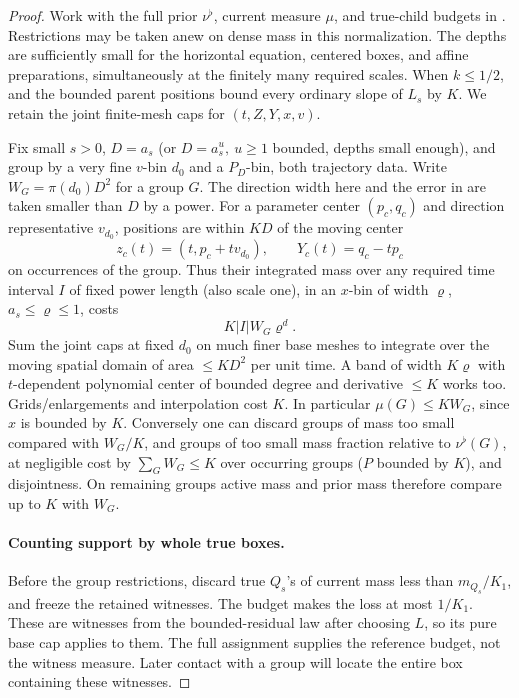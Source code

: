 \begin{proof}
Work with the full prior \(\nu^\flat\), current measure
\(\mu\), and true-child budgets in .
Restrictions may be taken anew on dense mass in this normalization.
The depths are sufficiently small for the horizontal equation,
centered boxes, and affine preparations, simultaneously at the
finitely many required scales.  When \(k\le1/2\),
 and the bounded parent positions
bound every ordinary slope of \(L_s\) by \(K\).  We retain
the joint finite-mesh caps for \((t,Z,Y,x,v)\).

Fix small \(s>0\), \(D=a_s\) (or \(D=a_s^u,\ u\ge1\) bounded, depths small enough), and group by a very fine \(v\)-bin \(d_0\) and a \(P_D\)-bin, both trajectory data. Write \(W_G=\pi(d_0)D^2\) for a group \(G\). The direction width here and the error in  are taken smaller than \(D\) by a power. For a parameter center \((p_c,q_c)\) and direction representative \(v_{d_0}\), positions are within \(K D\) of the moving center
\[
 z_c(t)=(t,p_c+t v_{d_0}),\qquad Y_c(t)=q_c-tp_c
\]
on occurrences of the group. Thus their integrated mass over any required time interval \(I\) of fixed power length (also scale one), in an \(x\)-bin of width \(\varrho\), \(a_s\le\varrho\le1\), costs
\[
 K |I| W_G \varrho^d .
\]
Sum the joint caps at fixed \(d_0\) on much finer base meshes to integrate over the moving spatial domain of area \(\le K D^2\) per unit time. A band of width \(K\varrho\) with \(t\)-dependent polynomial center of bounded degree and derivative \(\le K\) works too. Grids/enlargements and interpolation cost \(K\). In particular \(\mu(G)\le K W_G\), since \(x\) is bounded by \(K\). Conversely one can discard groups of mass too small compared with \(W_G/K\), and groups of too small mass fraction relative to \(\nu^\flat(G)\), at negligible cost by \(\sum_G W_G\le K\) over occurring groups (\(P\) bounded by \(K\)), and disjointness. On remaining groups active mass and prior mass therefore compare up to \(K\) with \(W_G\).

\paragraph{Counting support by whole true boxes.}
Before the group restrictions, discard true \(Q_s\)'s of current
mass less than \(m_{Q_s}/K_1\), and freeze the retained witnesses.
The budget  makes the loss at most
\(1/K_1\).  These are witnesses from the bounded-residual law
after choosing \(L\), so its pure base cap applies to them.
The full assignment supplies the reference budget, not the witness
measure.  Later contact with a group will locate the entire box
containing these witnesses.


\end{proof}
